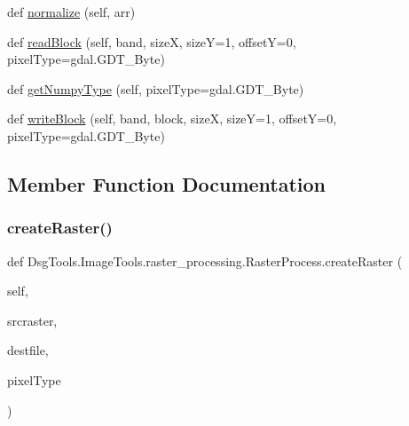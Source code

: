 \begin{DoxyCompactItemize}
\item 
def \mbox{\hyperlink{class_dsg_tools_1_1_image_tools_1_1raster__processing_1_1_raster_process_a7405dd5cf5bd2de7f65e0e7bb0a404ae}{normalize}} (self, arr)
\item 
def \mbox{\hyperlink{class_dsg_tools_1_1_image_tools_1_1raster__processing_1_1_raster_process_a12d8f5cf2100deb19ccf59e86596648e}{read\+Block}} (self, band, sizeX, sizeY=1, offsetY=0, pixel\+Type=gdal.\+G\+D\+T\+\_\+\+Byte)
\item 
def \mbox{\hyperlink{class_dsg_tools_1_1_image_tools_1_1raster__processing_1_1_raster_process_af890891226e6d4972902850f68100d88}{get\+Numpy\+Type}} (self, pixel\+Type=gdal.\+G\+D\+T\+\_\+\+Byte)
\item 
def \mbox{\hyperlink{class_dsg_tools_1_1_image_tools_1_1raster__processing_1_1_raster_process_abd1c9e282d7419d6f808986c26f7bdd2}{write\+Block}} (self, band, block, sizeX, sizeY=1, offsetY=0, pixel\+Type=gdal.\+G\+D\+T\+\_\+\+Byte)
\end{DoxyCompactItemize}


\subsection{Member Function Documentation}
\mbox{\label{class_dsg_tools_1_1_image_tools_1_1raster__processing_1_1_raster_process_ae0baa21e8ad949a1b32a7b5009cdda5b}} 
\subsubsection{\texorpdfstring{create\+Raster()}{createRaster()}}
{\footnotesize\ttfamily def Dsg\+Tools.\+Image\+Tools.\+raster\+\_\+processing.\+Raster\+Process.\+create\+Raster (\begin{DoxyParamCaption}\item[{}]{self,  }\item[{}]{srcraster,  }\item[{}]{destfile,  }\item[{}]{pixel\+Type }\end{DoxyParamCaption})}

